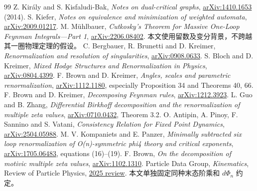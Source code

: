 \documentclass[11pt,a4paper,oneside]{ctexrep}
\theoremstyle{cnplain}
\theoremstyle{definition}
\theoremstyle{remark}
\begin{document}
\begin{thebibliography}{99}
 Z. Király and S. Kisfaludi-Bak, \emph{Notes on dual-critical graphs}, \href{https://arxiv.org/abs/1410.1653}{arXiv:1410.1653} (2014).
 S. Kiefer, \emph{Notes on equivalence and minimization of weighted automata}, \href{https://arxiv.org/abs/2009.01217}{arXiv:2009.01217}.
 M. Mühlbauer, \emph{Cutkosky's Theorem for Massive One-Loop Feynman Integrals---Part 1}, \href{https://arxiv.org/abs/2206.08402}{arXiv:2206.08402}. 本文使用留数及变分背景，不跨越其一圈物理定理的假设。
 C. Bergbauer, R. Brunetti and D. Kreimer, \emph{Renormalization and resolution of singularities}, \href{https://arxiv.org/abs/0908.0633}{arXiv:0908.0633}.
 S. Bloch and D. Kreimer, \emph{Mixed Hodge Structures and Renormalization in Physics}, \href{https://arxiv.org/abs/0804.4399}{arXiv:0804.4399}.
 F. Brown and D. Kreimer, \emph{Angles, scales and parametric renormalization}, \href{https://arxiv.org/abs/1112.1180}{arXiv:1112.1180}, especially Proposition 34 and Theorems 40, 66.
 F. Brown and D. Kreimer, \emph{Decomposing Feynman rules}, \href{https://arxiv.org/abs/1212.3923}{arXiv:1212.3923}.
 L. Guo and B. Zhang, \emph{Differential Birkhoff decomposition and the renormalization of multiple zeta values}, \href{https://arxiv.org/abs/0710.0432}{arXiv:0710.0432}, Theorem 3.2.
 O. Antipin, A. Pinoy, F. Sannino and S. Vatani, \emph{Consistency Relation for Fixed Point Dynamics}, \href{https://arxiv.org/abs/2504.05988}{arXiv:2504.05988}.
 M. V. Kompaniets and E. Panzer, \emph{Minimally subtracted six loop renormalization of O(n)-symmetric phi4 theory and critical exponents}, \href{https://arxiv.org/abs/1705.06483}{arXiv:1705.06483}, equations (16)--(19).
 F. Brown, \emph{On the decomposition of motivic multiple zeta values}, \href{https://arxiv.org/abs/1102.1310}{arXiv:1102.1310}.
 Particle Data Group, \emph{Kinematics}, Review of Particle Physics, \href{https://pdg.lbl.gov/2025/reviews/rpp2025-rev-kinematics.pdf}{2025 review}. 本文单独固定同种末态阶乘和 $d\Phi_n$ 约定。
\end{thebibliography}

\end{document}
